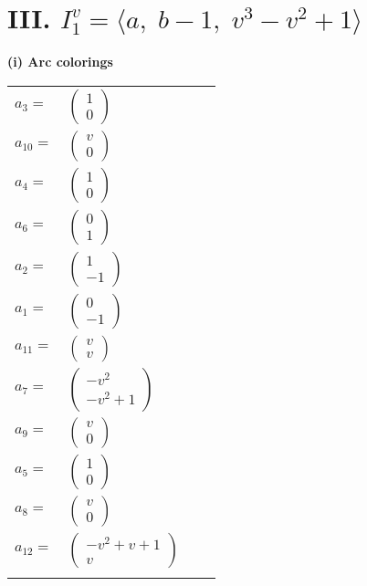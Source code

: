 \documentclass[1p]{elsarticle_modified}
\theoremstyle{definition}
\begin{document}
\centering \section*{III. $I^v_{1}= \langle a,\;b-1,\;v^3- v^2+1 \rangle$}
\flushleft \textbf{(i) Arc colorings}\\
\begin{tabular}{m{7pt} m{180pt} m{7pt} m{180pt} }
\flushright $a_{3}=$&$\begin{pmatrix}1\\0\end{pmatrix}$ \\
\flushright $a_{10}=$&$\begin{pmatrix}v\\0\end{pmatrix}$ \\
\flushright $a_{4}=$&$\begin{pmatrix}1\\0\end{pmatrix}$ \\
\flushright $a_{6}=$&$\begin{pmatrix}0\\1\end{pmatrix}$ \\
\flushright $a_{2}=$&$\begin{pmatrix}1\\-1\end{pmatrix}$ \\
\flushright $a_{1}=$&$\begin{pmatrix}0\\-1\end{pmatrix}$ \\
\flushright $a_{11}=$&$\begin{pmatrix}v\\v\end{pmatrix}$ \\
\flushright $a_{7}=$&$\begin{pmatrix}- v^2\\- v^2+1\end{pmatrix}$ \\
\flushright $a_{9}=$&$\begin{pmatrix}v\\0\end{pmatrix}$ \\
\flushright $a_{5}=$&$\begin{pmatrix}1\\0\end{pmatrix}$ \\
\flushright $a_{8}=$&$\begin{pmatrix}v\\0\end{pmatrix}$ \\
\flushright $a_{12}=$&$\begin{pmatrix}- v^2+v+1\\v\end{pmatrix}$\\&\end{tabular}
\end{document}
